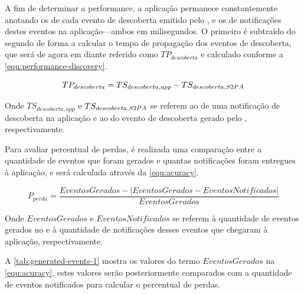 A fim de determinar a performance, a aplicação permanece constantemente anotando os \timestamps de cada evento de descoberta emitido pelo \stwopa, e os \timestamps de notificações destes eventos na aplicação---ambos em milisegundos. O primeiro \timestamp é subtraído do segundo de forma a calcular o tempo de propagação dos eventos de descoberta, que será de agora em diante referido como $TP_{descoberta}$ e calculado conforme a \autoref{equ:performance-discovery}.

\begin{equation}
	\label{equ:performance-discovery}
	TP_{descoberta} = TS_{descoberta,app} - TS_{descoberta,S2PA}
\end{equation}

Onde $TS_{descoberta,app}$ e $TS_{descoberta,S2PA}$ se referem ao \timestamp de uma notificação de descoberta na aplicação e ao \timestamp do evento de descoberta gerado pelo \stwopa, respectivamente.

Para avaliar percentual de perdas, é realizada uma comparação entre a quantidade de eventos que foram gerados e quantas notificações foram entregues à aplicação, e será calculada através da \autoref{equ:acuracy}.

\begin{equation}
	\label{equ:acuracy}
	P_{perda} = \frac{EventosGerados - |EventosGerados - EventosNotificados|}{EventosGerados}
\end{equation}

Onde $EventosGerados$ e $EventosNotificados$ se referem à quantidade de eventos gerados no \stwopa e à quantidade de notificações desses eventos que chegaram à aplicação, respectivamente.

A \autoref{tab:generated-events-1} mostra os valores do termo $EventosGerados$ na \autoref{equ:acuracy}, estes valores serão posteriormente comparados com a quantidade de eventos notificados para calcular o percentual de perdas.

\begin{table}[htb]
	\begin{center}
	\end{center}
\end{table}

